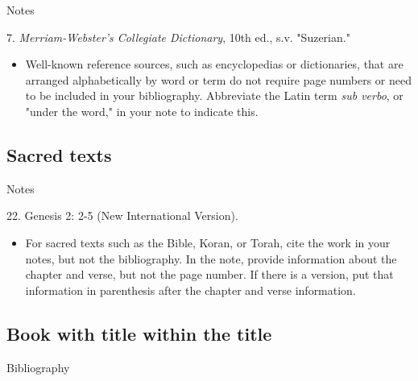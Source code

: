 \begin{center}{Notes}\end{center} 

\begin{singlespace}
\noindent\hspace{1.2cm}7.
\emph{Merriam-Webster's Collegiate Dictionary}, 10th ed., s.v. "Suzerian."
\end{singlespace}


\begin{itemize}\item Well-known reference sources, such as encyclopedias or
dictionaries, that are arranged alphabetically by word or term do not require
page numbers or need to be included in your bibliography. Abbreviate the Latin
term \emph{sub verbo}, or "under the word," in your note to indicate
this.\end{itemize}

\subsection{Sacred texts} \begin{center}{Notes}\end{center}
\begin{singlespace}
\noindent\hspace{1.2cm}22. Genesis 2: 2-5 (New International Version).
\end{singlespace}

\begin{itemize}\item For sacred texts such as the Bible, Koran, or Torah, cite
the work in your notes, but not the bibliography. In the note, provide
information about the chapter and verse, but not the page number. If there is a
version, put that information in parenthesis after the chapter and verse
information. \end{itemize}

\subsection{Book with title within the title}

\begin{center}{Bibliography}\end{center} 

\begin{singlespace}
\noindent{}
\end{singlespace}

